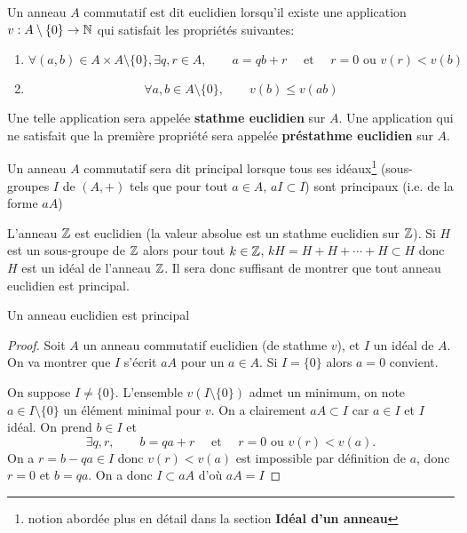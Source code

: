 \begin{dfn}
    Un anneau $A$ commutatif est dit euclidien lorsqu'il existe une application $v:A\setminus\{0\} \to \mathbb N$ qui satisfait les propriétés suivantes:
    \begin{enumerate}
        \item \[
                \forall (a, b)\in A\times A\setminus\{0\}, \exists q, r\in A, \qquad a=qb+r\quad \text{ et } \quad r=0\text{ ou } v(r)<v(b)
            \]
        \item \[
                \forall a, b\in A\setminus\{0\}, \qquad v(b)\leq v(ab)
            \]
    \end{enumerate}
    Une telle application sera appelée \textbf{stathme euclidien} sur $A$. Une application qui ne satisfait que la première propriété sera appelée \textbf{préstathme euclidien} sur $A$.

    Un anneau $A$ commutatif sera dit principal lorsque tous ses idéaux\footnote{notion abordée plus en détail dans la section \textbf{Idéal d'un anneau}} (sous-groupes $I$ de $(A, +)$ tels que pour tout $a\in A$, $aI\subset I$) sont principaux (i.e. de la forme $aA$)
\end{dfn}

L'anneau $\mathbb Z$ est euclidien (la valeur absolue est un stathme euclidien sur $\mathbb Z$). Si $H$ est un sous-groupe de $\mathbb Z$ alors pour tout $k\in\mathbb Z$, $kH=H+H+\cdots +H\subset H$ donc $H$ est un idéal de l'anneau $\mathbb Z$. Il sera donc suffisant de montrer que tout anneau euclidien est principal.

\begin{prop}
    Un anneau euclidien est principal
\end{prop}

\begin{proof}
    Soit $A$ un anneau commutatif euclidien (de stathme $v$), et $I$ un idéal de $A$. On va montrer que $I$ s'écrit $aA$ pour un $a\in A$. Si $I=\{0\}$ alors $a=0$ convient.

    On suppose $I\neq \{0\}$. L'ensemble $v(I\setminus\{0\})$ admet un minimum, on note $a\in I\setminus\{0\}$ un élément minimal pour $v$. On a clairement $aA\subset I$ car $a\in I$ et $I$ idéal. On prend $b\in I$ et \[
        \exists q, r, \qquad b=qa+r\quad \text{ et }\quad r=0\text{ ou }v(r)<v(a).
    \]
    On a $r=b-qa\in I$ donc $v(r)<v(a)$ est impossible par définition de $a$, donc $r=0$ et $b=qa$. On a donc $I\subset aA$ d'où $aA=I$
\end{proof}

